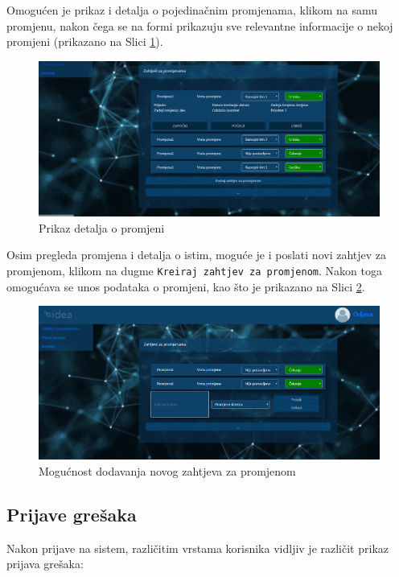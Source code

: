 \documentclass[12pt,a4paper]{article}
\begin{document}
Omogućen je prikaz i detalja o pojedinačnim promjenama, klikom na samu promjenu, nakon čega se na formi prikazuju sve relevantne informacije o nekoj promjeni (prikazano na Slici \ref{s9}).

\begin{figure}[H]
\center
\includegraphics[scale=0.35]{../res/UI/changeDetails.PNG}
\caption{Prikaz detalja o promjeni}
\label{s9}
\end{figure}

Osim pregleda promjena i detalja o istim, moguće je i poslati novi zahtjev za promjenom, klikom na dugme \texttt{Kreiraj zahtjev za promjenom}. Nakon toga omogućava se unos podataka o promjeni, kao što je prikazano na Slici \ref{s10}.

\begin{figure}[H]
\center
\includegraphics[scale=0.35]{../res/UI/changeAdd.PNG}
\caption{Mogućnost dodavanja novog zahtjeva za promjenom}
\label{s10}
\end{figure}

\subsection{Prijave grešaka}

Nakon prijave na sistem, različitim vrstama korisnika vidljiv je različit prikaz prijava grešaka:
\end{document}
